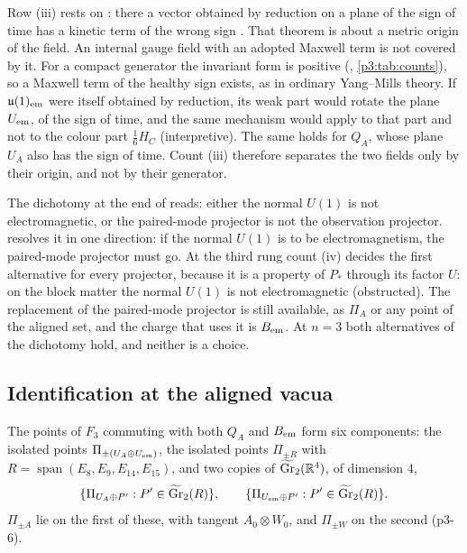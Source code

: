 Row (iii) rests on \cite[Cor.~23.6, Thm.~30.4]{ES17}: there a vector obtained by reduction on a plane of the sign of time has a kinetic term of the wrong sign
\cite{Hull98}. That theorem is about a metric origin of the field. An internal gauge field with an adopted Maxwell term is not covered by it. For a compact generator
the invariant form is positive (\cite[Thm.~2.3]{ES17}, \cref{p3:tab:counts}), so a Maxwell term of the healthy sign exists, as in ordinary Yang--Mills theory. If $\mathfrak{u}(1)_{\rm em}$
were itself obtained by reduction, its weak part would rotate the plane $U_{\rm em}$, of the sign of time, and the same mechanism would apply to that part and not to the
colour part $\tfrac16H_C$ (interpretive). The same holds for $Q_A$, whose plane $U_A$ also has the sign of time. Count (iii) therefore separates the two fields only by
their origin, and not by their generator.

The dichotomy at the end of \cite[Section~25]{ES17} reads: either the normal $U(1)$ is not electromagnetic, or the paired-mode projector is not the observation projector.
\cite[Section~26]{ES17} resolves it in one direction: if the normal $U(1)$ is to be electromagnetism, the paired-mode projector must go. At the third rung count (iv)
decides the first alternative for every projector, because it is a property of $P_*$ through its factor $U$: on the block matter the normal $U(1)$ is not electromagnetic
(obstructed). The replacement of the paired-mode projector is still available, as $\Pi_A$ or any point of the aligned set, and the charge that uses it is $B_{\rm em}$.
At $n=3$ both alternatives of the dichotomy hold, and neither is a choice.

\subsection{Identification at the aligned vacua}
\label{p3:sec:ident}

\begin{proposition}
\label{p3:prop:jointfixed}
The points of $F_3$ commuting with both $Q_A$ and $B_{\rm em}$ form six components: the isolated points $\Pi_{\pm(U_A\oplus U_{\rm em})}$, the isolated points $\Pi_{\pm R}$ with
$R=\operatorname{span}(E_8,E_9,E_{14},E_{15})$, and two copies of $\widetilde{\mathrm{Gr}}_2(\mathbb{R}^4)$, of dimension $4$,
\[
\{\Pi_{U_A\oplus P'}:P'\in\widetilde{\mathrm{Gr}}_2(R)\},\qquad\{\Pi_{U_{\rm em}\oplus P'}:P'\in\widetilde{\mathrm{Gr}}_2(R)\}.
\]
$\Pi_{\pm A}$ lie on the first of these, with tangent $A_0\otimes W_0$, and $\Pi_{\pm W}$ on the second (p3-6).
\end{proposition}

